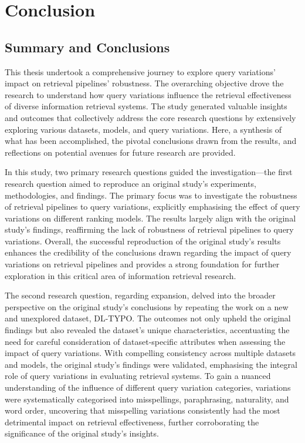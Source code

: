 \chapter{Conclusion}
\section{Summary and Conclusions}
This thesis undertook a comprehensive journey to explore query variations' impact on retrieval pipelines' robustness. The overarching objective drove the research to understand how query variations influence the retrieval effectiveness of diverse information retrieval systems. The study generated valuable insights and outcomes that collectively address the core research questions by extensively exploring various datasets, models, and query variations. Here, a synthesis of what has been accomplished, the pivotal conclusions drawn from the results, and reflections on potential avenues for future research are provided.

In this study, two primary research questions guided the investigation—the first research question aimed to reproduce an original study's experiments, methodologies, and findings. The primary focus was to investigate the robustness of retrieval pipelines to query variations, explicitly emphasising the effect of query variations on different ranking models. The results largely align with the original study's findings, reaffirming the lack of robustness of retrieval pipelines to query variations. Overall, the successful reproduction of the original study's results enhances the credibility of the conclusions drawn regarding the impact of query variations on retrieval pipelines and provides a strong foundation for further exploration in this critical area of information retrieval research.

The second research question, regarding expansion, delved into the broader perspective on the original study's conclusions by repeating the work on a new and unexplored dataset, DL-TYPO. The outcomes not only upheld the original findings but also revealed the dataset's unique characteristics, accentuating the need for careful consideration of dataset-specific attributes when assessing the impact of query variations. With compelling consistency across multiple datasets and models, the original study's findings were validated, emphasising the integral role of query variations in evaluating retrieval systems. To gain a nuanced understanding of the influence of different query variation categories, variations were systematically categorised into misspellings, paraphrasing, naturality, and word order, uncovering that misspelling variations consistently had the most detrimental impact on retrieval effectiveness, further corroborating the significance of the original study's insights.

